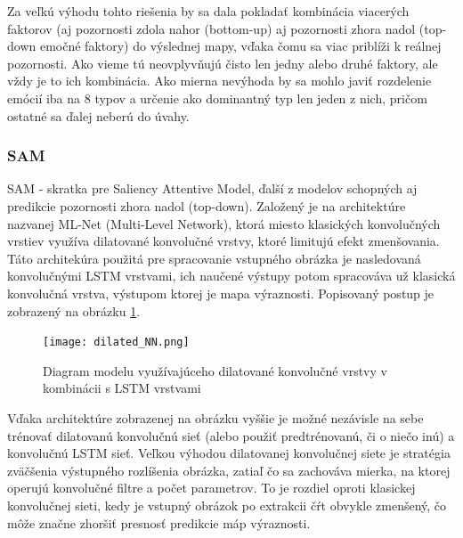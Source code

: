 Za veľkú výhodu tohto riešenia by sa dala pokladať kombinácia viacerých faktorov (aj pozornosti zdola nahor (bottom-up) aj pozornosti zhora nadol (top-down emočné faktory)  do výslednej mapy, vďaka čomu sa viac priblíži k reálnej pozornosti. Ako vieme tú neovplyvňujú čisto len jedny alebo druhé faktory, ale vždy je to ich kombinácia. Ako mierna nevýhoda by sa mohlo javiť rozdelenie emócií iba na 8 typov a určenie ako dominantný typ len jeden z nich, pričom ostatné sa ďalej neberú do úvahy.  


\subsubsection{SAM}
SAM - skratka pre Saliency Attentive Model\cite{cornia2016predicting}, ďalší z modelov schopných aj predikcie pozornosti zhora nadol (top-down). Založený je na architektúre nazvanej ML-Net (Multi-Level Network\cite{cornia2016deep}), ktorá miesto klasických konvolučných vrstiev využíva dilatované konvolučné vrstvy, ktoré limitujú efekt zmenšovania. Táto architekúra použitá pre spracovanie vstupného obrázka je nasledovaná konvolučnými LSTM vrstvami, ich naučené výstupy potom spracováva už klasická konvolučná vrstva, výstupom ktorej je mapa výraznosti. Popisovaný postup je zobrazený na obrázku \ref{dilated_model_image}.

\begin{figure}[H]
	\begin{center}
		\texttt{[image: dilated\_NN.png]}
		\caption[Diagram konvolučnej LSTM siete]{Diagram modelu využívajúceho dilatované konvolučné vrstvy v kombinácii s LSTM vrstvami \cite{cornia2016predicting}\label{dilated_model_image}}
	\end{center}
\end{figure}

Vďaka architektúre zobrazenej na obrázku vyššie je možné nezávisle na sebe trénovať dilatovanú konvolučnú sieť (alebo použiť predtrénovanú, či o niečo inú) a konvolučnú LSTM sieť. Veľkou výhodou dilatovanej konvolučnej siete je stratégia zväčšenia výstupného rozlíšenia obrázka, zatiaľ čo sa zachováva mierka, na ktorej operujú konvolučné filtre a počet parametrov. To je rozdiel oproti klasickej konvolučnej sieti, kedy je vstupný obrázok po extrakcii čŕt obvykle zmenšený, čo môže značne zhoršiť presnosť predikcie máp výraznosti.

